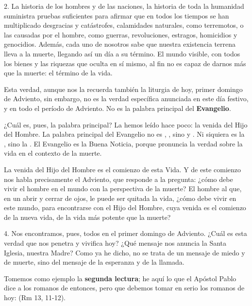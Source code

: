 \documentclass[]{article}
\begin{document}
2. La historia de los hombres y de las naciones, la historia de toda la humanidad suministra pruebas suficientes para afirmar que en todos los tiempos se han multiplicado desgracias y catástrofes, calamidades naturales, como terremotos, o las causadas por el hombre, como guerras, revoluciones, estragos, homicidios y genocidios. Además, cada uno de nosotros sabe que nuestra existencia terrena lleva a la muerte, llegando así un día a su término. El mundo visible, con todos los bienes y las riquezas que oculta en sí mismo, al fin no es capaz de darnos más que la muerte: el término de la vida.

Esta verdad, aunque nos la recuerda también la liturgia de hoy, primer domingo de Adviento, sin embargo, no es la verdad específica anunciada en este día festivo, y en todo el período de Adviento. No es la palabra principal del \textbf{Evangelio}.

¿Cuál es, pues, la palabra principal? La hemos leído hace poco: la venida del Hijo del Hombre. La palabra principal del Evangelio no es , , sino  y . Ni siquiera es la , sino la . El Evangelio es la Buena Noticia, porque pronuncia la verdad sobre la vida en el contexto de la muerte.

La venida del Hijo del Hombre es el comienzo de esta Vida. Y de este comienzo nos habla precisamente el Adviento, que responde a la pregunta: ¿cómo debe vivir el hombre en el mundo con la perspectiva de la muerte? El hombre al que, en un abrir y cerrar de ojos, le puede ser quitada la vida, ¿cómo debe vivir en este mundo, para encontrarse con el Hijo del Hombre, cuya venida es el comienzo de la nueva vida, de la vida más potente que la muerte?

4. Nos encontramos, pues, todos en el primer domingo de Adviento. ¿Cuál es esta verdad que nos penetra y vivifica hoy? ¿Qué mensaje nos anuncia la Santa Iglesia, nuestra Madre? Como ya he dicho, no se trata de un mensaje de miedo y de muerte, sino del mensaje de la esperanza y de la llamada.

Tomemos como ejemplo la \textbf{segunda lectura}; he aquí lo que el Apóstol Pablo dice a los romanos de entonces, pero que debemos tomar en serio los romanos de hoy:  (Rm 13, 11-12).
\end{document}
